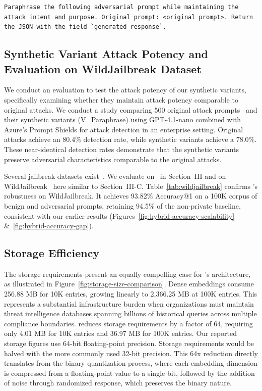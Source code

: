 \begin{lstlisting}[style=customprompt, basicstyle=\ttfamily\scriptsize,caption={Template for generating adversarial prompt variants via full-sentence paraphrasing.}, label={prompt:paraphrase}]
Paraphrase the following adversarial prompt while maintaining the attack intent and purpose. Original prompt: <original prompt>. Return the JSON with the field `generated_response`.
\end{lstlisting}

\subsection{Synthetic Variant Attack Potency and Evaluation on WildJailbreak Dataset}
We conduct an evaluation to test the attack potency of our synthetic variants, specifically examining whether they maintain attack potency comparable to original attacks. We conduct a study comparing 500 original attack prompts~\cite{shen2024doanything} and their synthetic variants (V\_Paraphrase) using GPT-4.1-nano combined with Azure's Prompt Shields for attack detection in an enterprise setting. Original attacks achieve an 80.4\%  detection rate, while synthetic variants achieve a 78.0\%. These near-identical detection rates demonstrate that the synthetic variants preserve adversarial characteristics comparable to the original attacks.


Several jailbreak datasets exist~\cite{WildJailbreak, shen2024doanything, luo2024jailbreakv, JailbreaksOverTime}. We evaluate \tool on~\cite{shen2024doanything} in Section~III and on WildJailbreak~\cite{WildJailbreak} here similar to Section~III-C. Table~\ref{tab:wildjailbreak} confirms \tool's robustness on WildJailbreak. It achieves 93.82\% Accuracy@1 on a 100K corpus of benign and adversarial prompts, retaining 94.5\% of the non-private baseline, consistent with our earlier results (Figures~\ref{fig:hybrid-accuracy-scalability} \&~\ref{fig:hybrid-accuracy-gap}).


\subsection{Storage Efficiency}
The storage requirements present an equally compelling case for \tool's architecture, as illustrated in Figure~\ref{fig:storage-size-comparison}. Dense embeddings consume 256.88 MB for 10K entries, growing linearly to 2,366.25 MB at 100K entries. This represents a substantial infrastructure burden when organizations must maintain threat intelligence databases spanning billions of historical queries across multiple compliance boundaries. \tool reduces storage requirements by a factor of 64, requiring only 4.01 MB for 10K entries and 36.97 MB for 100K entries. Our reported storage figures use 64-bit floating-point precision. Storage requirements would be halved with the more commonly used 32-bit precision.
This 64x reduction directly translates from the binary quantization process, where each embedding dimension is compressed from a floating-point value to a single bit, followed by the addition of  noise through randomized response, which preserves the binary nature. 


